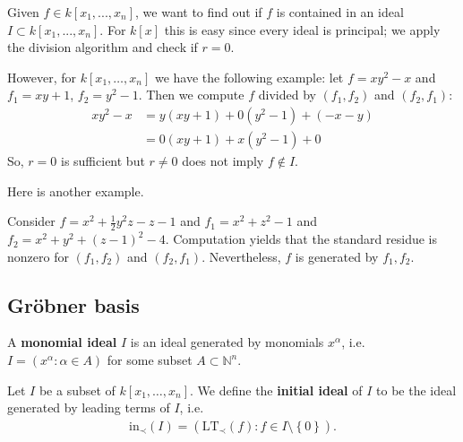\documentclass[a4paper, 11pt]{article}
\begin{document}
\begin{remark}
  Given \( f \in k[x_1,...,x_n]  \), we want to find out if \( f \) is contained in an ideal \( I \subset k[x_1,...,x_n] \). For \( k[x] \) this is easy since every ideal is principal; we apply the division algorithm and check if \( r=0 \).
\end{remark}

\begin{remark}


  However, for \( k[x_1,\dots,x_n] \) we have the following example: let \( f=xy^2 - x \) and \( f_1 = xy + 1 \), \( f_2 = y^2 - 1 \). Then we compute \( f \) divided by \( (f_1,f_2) \) and \( (f_2,f_1) \):
  \begin{align*}
    xy^2 - x 
    &= y(xy + 1) + 0(y^2 - 1) + (-x-y)  \\
    &= 0(xy + 1) + x(y^2 - 1) + 0
  \end{align*}
  So, \( r = 0 \) is sufficient but \( r\neq 0 \) does not imply \( f \notin I \).
\end{remark}

Here is another example.

  \begin{eg}
    Consider \( f = x^2 + \frac{1}{2}y^2z - z - 1 \) and \( f_1 = x^2  + z^2 - 1 \) and \( f_2 = x^2 + y^2 + (z-1)^2 -4 \). Computation yields that the standard residue is nonzero for \( (f_1,f_2) \) and \( (f_2,f_1) \). Nevertheless, \( f \) is generated by \( f_1,f_2 \).
\end{eg}

\subsection{Gröbner basis}


\begin{defi}
  A \textbf{monomial ideal} \( I \) is an ideal generated by monomials \( x^\alpha \), i.e. \( I = ( x^\alpha : \alpha \in A) \) for some subset \( A \subset \mathbb N^n \).
\end{defi}



\begin{defi}
  Let \( I \) be a subset of \( k[x_1,\dots,x_n] \). We define the \textbf{initial ideal} of \( I \) to be the ideal generated by leading terms of \( I \), i.e. 
  \begin{align*}
    \mathrm{in}_\prec(I) = (\mathrm{LT}_\prec(f) : f \in I \setminus \left\{ 0 \right\}).
  \end{align*}
\end{defi}
\end{document}
